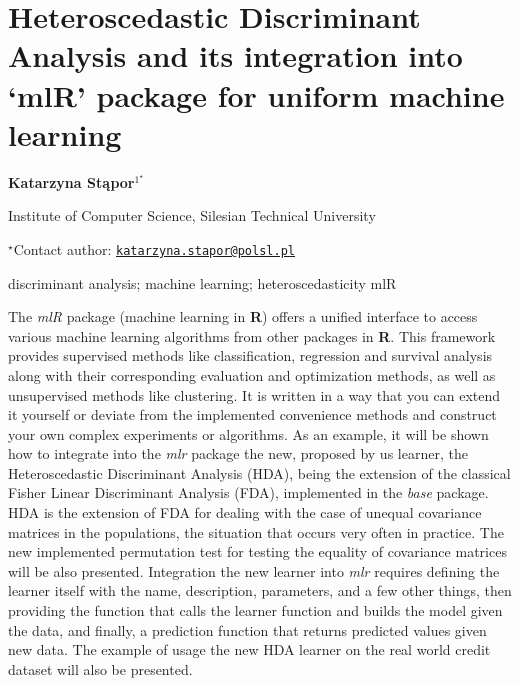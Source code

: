 \documentclass[\main/boa.tex]{subfiles}
\begin{document}
\section{Heteroscedastic Discriminant Analysis and its integration into `mlR'
package for uniform machine learning}

\begin{center}
  {\bf Katarzyna Stąpor$^{1^\star}$}
\end{center}

\vskip 0.3cm

\begin{affiliations}
\begin{enumerate}
\begin{minipage}{0.915\textwidth}
\centering
\item Institute of Computer Science, Silesian Technical University \\[-2pt]
\end{minipage}
\end{enumerate}
$^\star$Contact author: \href{mailto:katarzyna.stapor@polsl.pl}{\nolinkurl{katarzyna.stapor@polsl.pl}}\\
\end{affiliations}

\vskip 0.5cm

\begin{minipage}{0.915\textwidth}
\keywords discriminant analysis; machine learning; heteroscedasticity
\packages mlR
\end{minipage}

\vskip 0.8cm

The \emph{mlR} package (machine learning in \textbf{R}) offers a unified
interface to access various machine learning algorithms from other
packages in \textbf{R}. This framework provides supervised methods like
classification, regression and survival analysis along with their
corresponding evaluation and optimization methods, as well as
unsupervised methods like clustering. It is written in a way that you
can extend it yourself or deviate from the implemented convenience
methods and construct your own complex experiments or algorithms. As an
example, it will be shown how to integrate into the \emph{mlr} package
the new, proposed by us learner, the Heteroscedastic Discriminant
Analysis (HDA), being the extension of the classical Fisher Linear
Discriminant Analysis (FDA), implemented in the \emph{base} package. HDA
is the extension of FDA for dealing with the case of unequal covariance
matrices in the populations, the situation that occurs very often in
practice. The new implemented permutation test for testing the equality
of covariance matrices will be also presented. Integration the new
learner into \emph{mlr} requires defining the learner itself with the
name, description, parameters, and a few other things, then providing
the function that calls the learner function and builds the model given
the data, and finally, a prediction function that returns predicted
values given new data. The example of usage the new HDA learner on the
real world credit dataset will also be presented.
\end{document}
